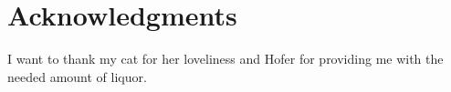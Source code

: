 \section*{Acknowledgments}

 I want to thank my cat for her loveliness and Hofer for providing me with the needed amount of liquor.